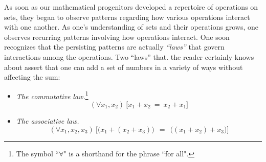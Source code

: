  
 
As soon as our mathematical progenitors developed a repertoire of operations on sets, they began to observe patterns regarding how various operations interact with one another.  As one's understanding of sets and their operations grows, one observes recurring patterns involving how operations interact.  One soon recognizes that the persisting patterns are actually {\em ``laws''} that govern interactions among the operations.  Two ``laws'' that. the reader certainly knows about assert that one can add a set of numbers in a variety of ways without affecting the sum:
\begin{itemize}
\item
{\it The commutative law.}\footnote{The symbol ``$\forall$" is a shorthand for the phrase ``for all".}
\[ (\forall x_1, x_2) \ \big[ x_1 + x_2 \ = \ x_2 + x_1 \big] \]

\medskip\item
{\it The associative law.}
\[ (\forall x_1, x_2, x_3) \ \big[ \big(x_1 + (x_2 + x_3)\big) \ \
= \ \ \big((x_1 + x_2) + x_3\big) \big]
\]
\end{itemize}

\bigskip

